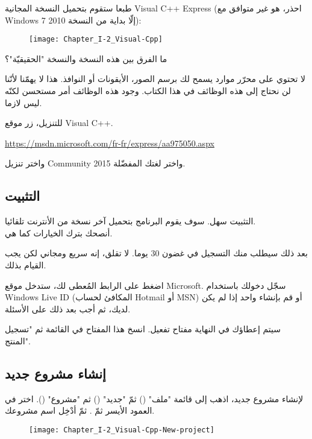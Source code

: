 طبعا ستقوم بتحميل النسخة المجانية
\textenglish{Visual C++ Express}
(احذر، هو غير متوافق مع
\textenglish{Windows 7}
إلّا بداية من النسخة 2010):

\begin{figure}[H]
	\centering
	\texttt{[image: Chapter\_I-2\_Visual-Cpp]}
\end{figure}

\begin{question}
ما الفرق بين هذه النسخة والنسخة "الحقيقيّة"؟
\end{question}

لا تحتوي على محرّر موارد يسمح لك برسم الصور، الأيقونات أو النوافذ. هذا لا يهمّنا لأنّنا لن نحتاج إلى هذه الوظائف في هذا الكتاب. وجود هذه الوظائف أمر مستحسن لكنّه ليس لازما.

للتنزيل، زر موقع
\textenglish{Visual C++}.

\url{https://msdn.microsoft.com/fr-fr/express/aa975050.aspx}

واختر تنزيل
\textenglish{Community 2015}
واختر لغتك المفضّلة.

\subsection{التثبيت}

التثبيت سهل. سوف يقوم البرنامج بتحميل آخر نسخة من الأنترنت تلقائيا.\\
أنصحك بترك الخيارات كما هي.

بعد ذلك سيطلب منك التسجيل في غضون 30 يوما. لا تقلق، إنه سريع ومجاني لكن يجب القيام بذلك.

اضغط على الرابط المُعطى لك، ستدخل موقع
\textenglish{Microsoft}.
سجّل دخولك باستخدام
\textenglish{Windows Live ID}
(المكافئ لحساب
\textenglish{Hotmail}
أو
\textenglish{MSN})
أو قم بإنشاء واحد إذا لم يكن لديك، ثم أجب بعد ذلك على الأسئلة.

سيتم إعطاؤك في النهاية مفتاح تفعيل. انسخ هذا المفتاح في القائمة
ثم
"تسجيل المنتج".

\subsection{إنشاء مشروع جديد}

لإنشاء مشروع جديد، اذهب إلى قائمة
"ملف"
()
ثمّ
"جديد"
()
ثم
"مشروع"
().
اختر
في العمود الأيسر ثمّ
.
ثمّ أدْخِل اسم مشروعك.

\begin{figure}[H]
	\centering
	\texttt{[image: Chapter\_I-2\_Visual-Cpp-New-project]}
\end{figure}

